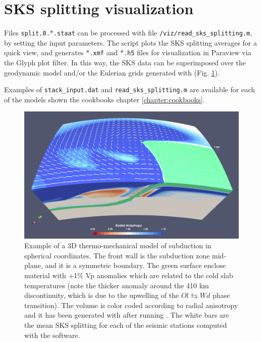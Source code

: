 \section{SKS splitting visualization}
Files \texttt{split.0.$*$.staat} can be processed with file \texttt{/viz/read\_sks\_splitting.m}, by setting the input parameters. The script plots the SKS splitting averages for a quick view, and generates \texttt{$*$.xmf} and \texttt{$*$.h5} files for visualization in Paraview via the Glyph plot filter. In this way, the SKS data can be superimposed over the geodynamic model and/or the Eulerian grids generated with \viztomotitle{}   (Fig. \ref{fig:radial+sks}). 

Examples of \texttt{stack\_input.dat} and \texttt{read\_sks\_splitting.m} are available for each of the models shown the cookbooks chapter \ref{chapter:cookbooks}.

\begin{figure}
    \centering
    \includegraphics[width=1.0\textwidth]{SKS-SPLIT/Radial+SKS.png}
    \caption{Example of a 3D thermo-mechanical model of subduction in spherical coordinates. The front wall is the subduction zone mid-plane, and it is a symmetric boundary. The green surface enclose material with +1\% Vp anomalies which are related to the cold slab temperatures (note the thicker anomaly around the 410 km discontinuity, which is due to the upwelling of the $Ol \leftrightarrows Wd$ phase transition). The volume is color coded according to radial anisotropy and it has been generated with \viztomotitle{} after running \drexmtitle. The white bars are the mean SKS splitting for each of the seismic stations computed with the \skstitle{} software.}
    \label{fig:radial+sks}
\end{figure}




  



 
